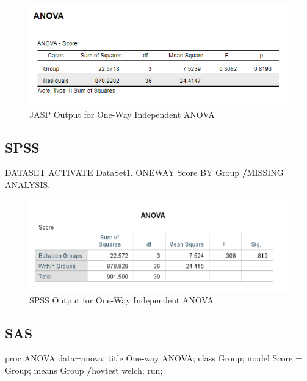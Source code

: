 \documentclass[
]{book}
\newenvironment{Shaded}{\begin{snugshade}}{\end{snugshade}}
\newcommand{\NormalTok}[1]{#1}
\newcommand{\OperatorTok}[1]{\textcolor[rgb]{0.81,0.36,0.00}{\textbf{#1}}}
\newcommand{\StringTok}[1]{\textcolor[rgb]{0.31,0.60,0.02}{#1}}
\begin{document}
\begin{figure}[!h]
\includegraphics{Screenshots/ANOVA/anovaJASP} \caption{\label{fig:anovaJASP}JASP Output for One-Way Independent ANOVA}\label{fig:anovaJASP}
\end{figure}

\hypertarget{spss}{%
\subsection{SPSS}\label{spss}}

\begin{Shaded}
\begin{Highlighting}[]
\NormalTok{DATASET ACTIVATE DataSet1.}
\NormalTok{ONEWAY Score BY Group}
  \OperatorTok{/}\NormalTok{MISSING ANALYSIS.}
\end{Highlighting}
\end{Shaded}

\begin{figure}[!h]
\includegraphics{Screenshots/ANOVA/anovaSPSS} \caption{\label{fig:anovaSPSS}SPSS Output for One-Way Independent ANOVA}\label{fig:anovaSPSS}
\end{figure}

\hypertarget{sas}{%
\subsection{SAS}\label{sas}}

\begin{Shaded}
\begin{Highlighting}[]
\NormalTok{proc ANOVA data=anova;}
\NormalTok{	title One}\OperatorTok{-}\NormalTok{way ANOVA;}
\NormalTok{	class Group;}
\NormalTok{	model Score =}\StringTok{ }\NormalTok{Group;}
\NormalTok{	means Group }\OperatorTok{/}\NormalTok{hovtest welch;}
\NormalTok{	run;}
\end{Highlighting}
\end{Shaded}
\end{document}
